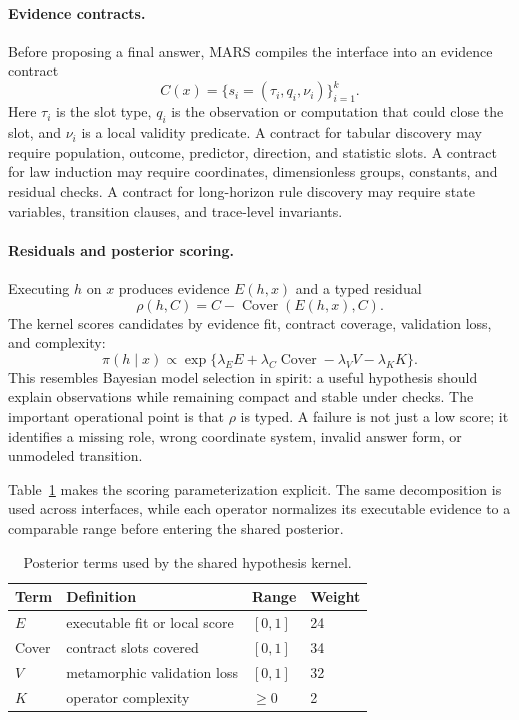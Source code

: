 \documentclass[letterpaper]{article}
\newcommand{\mars}{\textsc{MARS}\xspace}
\begin{document}
\paragraph{Evidence contracts.}
Before proposing a final answer, \mars compiles the interface into an evidence
contract
\begin{equation}
  C(x)=\{s_i=(\tau_i,q_i,\nu_i)\}_{i=1}^{k}.
\end{equation}
Here $\tau_i$ is the slot type, $q_i$ is the observation or computation that
could close the slot, and $\nu_i$ is a local validity predicate. A contract for
tabular discovery may require population, outcome, predictor, direction, and
statistic slots. A contract for law induction may require coordinates,
dimensionless groups, constants, and residual checks. A contract for
long-horizon rule discovery may require state variables, transition clauses,
and trace-level invariants.

\paragraph{Residuals and posterior scoring.}
Executing $h$ on $x$ produces evidence $E(h,x)$ and a typed residual
\begin{equation}
  \rho(h,C)=C-\operatorname{Cover}(E(h,x),C).
\end{equation}
The kernel scores candidates by evidence fit, contract coverage, validation
loss, and complexity:
\begin{equation}
  \pi(h\mid x)\propto
  \exp\{\lambda_E E+\lambda_C\operatorname{Cover}
  -\lambda_V V-\lambda_K K\}.
\end{equation}
This resembles Bayesian model selection in spirit: a useful hypothesis should
explain observations while remaining compact and stable under checks. The
important operational point is that $\rho$ is typed. A failure is not just a low
score; it identifies a missing role, wrong coordinate system, invalid answer
form, or unmodeled transition.

Table~\ref{tab:score_terms} makes the scoring parameterization explicit. The
same decomposition is used across interfaces, while each operator normalizes
its executable evidence to a comparable range before entering the shared
posterior.

\begin{table}[H]
\centering
\small
\caption{Posterior terms used by the shared hypothesis kernel.}
\label{tab:score_terms}
\begin{tabular}{@{}llll@{}}
\toprule
Term & Definition & Range & Weight \\
\midrule
$E$ & executable fit or local score & $[0,1]$ & 24 \\
Cover & contract slots covered & $[0,1]$ & 34 \\
$V$ & metamorphic validation loss & $[0,1]$ & 32 \\
$K$ & operator complexity & $\geq0$ & 2 \\
\bottomrule
\end{tabular}
\end{table}
\end{document}
